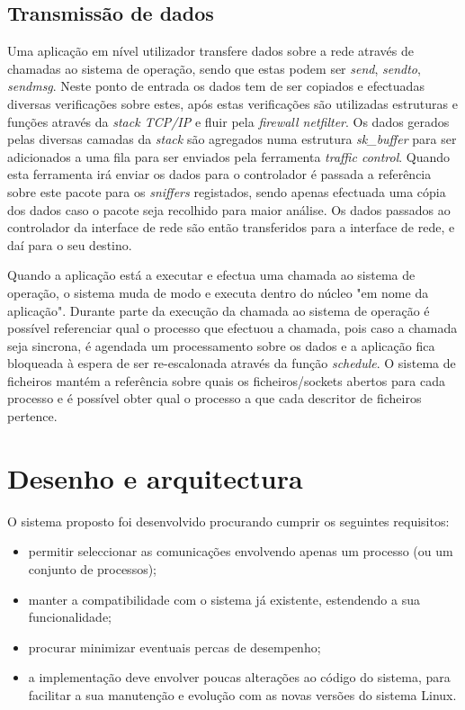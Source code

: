 \subsection{Transmissão de dados}

Uma aplicação em nível utilizador transfere dados sobre a rede através de chamadas ao sistema de operação, sendo que estas podem ser \textit{send}, \textit{sendto}, \textit{sendmsg}.
 Neste ponto de entrada os dados tem de ser copiados e efectuadas diversas verificações sobre estes, após estas verificações são utilizadas estruturas e funções através da \textit{stack TCP/IP} e fluir pela \textit{firewall netfilter}.
 Os dados gerados pelas diversas camadas da \textit{stack} são agregados numa estrutura \textit{sk\_buffer} para ser adicionados a uma fila para ser enviados pela ferramenta \textit{traffic control}.
 Quando esta ferramenta irá enviar os dados para o controlador é passada a referência sobre este pacote para os \textit{sniffers} registados, sendo apenas efectuada uma cópia dos dados caso o pacote seja recolhido para maior análise. Os dados passados ao controlador da interface de rede são então transferidos para a interface de rede, e daí para o seu destino.

Quando a aplicação está a executar e efectua uma chamada ao sistema de operação, o sistema muda de modo e executa dentro do núcleo "em nome da aplicação".
 Durante parte da execução da chamada ao sistema de operação é possível referenciar qual o processo que efectuou a chamada, pois caso a chamada seja sincrona, é agendada um processamento sobre os dados e a aplicação fica bloqueada à espera de ser re-escalonada através da função \textit{schedule}.
 O sistema de ficheiros mantém a referência sobre quais os ficheiros/sockets abertos para cada processo e é possível obter qual o processo a que cada descritor de ficheiros pertence. %

\section{Desenho e arquitectura}
\label{sec:architecture}

O sistema proposto foi desenvolvido procurando cumprir os seguintes requisitos:
\begin{itemize}
\item permitir seleccionar as comunicações envolvendo apenas um processo (ou um conjunto de processos);
\item manter a compatibilidade com o sistema já existente, estendendo a sua funcionalidade;
\item procurar minimizar eventuais percas de desempenho;
\item a implementação deve envolver poucas alterações ao código do sistema, para facilitar a sua manutenção e evolução com as novas versões do sistema Linux.
\end{itemize}

